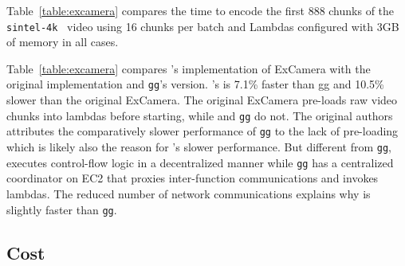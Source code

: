 Table~\ref{table:excamera} compares the time to encode the first 888 chunks of
the \texttt{sintel-4k}~\cite{sintel-4k} video using 16 chunks per batch and
Lambdas configured with 3GB of memory in all cases.



Table~\ref{table:excamera} compares \name{}'s implementation of ExCamera with
the original implementation and \texttt{gg}'s version. \name{}'s is 7.1\%
faster than gg and 10.5\% slower than the original ExCamera. The original
ExCamera pre-loads raw video chunks into lambdas before starting, while
\name{} and \texttt{gg} do not. The original authors attributes the
comparatively slower performance of \texttt{gg} to the lack of pre-loading
which is likely also the reason for \name{}'s slower performance. But
different from \texttt{gg}, \name{} executes control-flow logic in a
decentralized manner while \texttt{gg} has a centralized coordinator on EC2
that proxies inter-function communications and invokes lambdas. The reduced
number of network communications  explains why \name{} is slightly
faster than \texttt{gg}.


\subsection{Cost}

